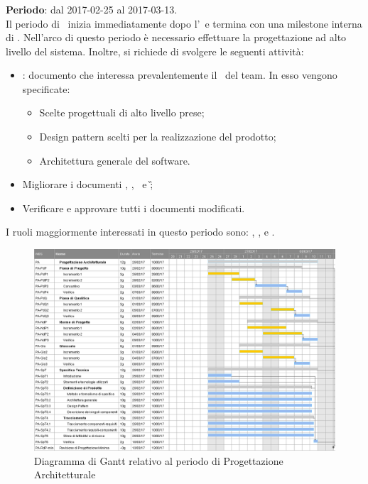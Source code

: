 		
		\subsubsection{\PA}
		\textbf{Periodo}: dal 2017-02-25 al 2017-03-13.\\
		Il periodo di \PA\ inizia immediatamente dopo l'\AR\ e termina con una milestone interna di \RPMin. Nell'arco di questo periodo è necessario effettuare la progettazione ad alto livello del sistema. Inoltre, si richiede di svolgere le seguenti attività:
		\begin{itemize}
			\item \textit{\ST}: documento che interessa prevalentemente il \textit{\Prog}\ del team. In esso vengono specificate:
			\begin{itemize}
				\item Scelte progettuali di alto livello prese;
				\item Design pattern scelti per la realizzazione del prodotto;
				\item Architettura generale del software.
			\end{itemize}
			\item Migliorare i documenti \NdP, \PdP, \PdQ\ e \G;
			\item Verificare e approvare tutti i documenti modificati.
		\end{itemize}
		I ruoli maggiormente interessati in questo periodo sono: \textit{\Amm}, \textit{\Res}, \textit{\Prog} e \textit{\Ver}.
		
		\begin{figure}[ht]
			\centering
			\includegraphics[scale=0.4]{img/ganttnetbreak3.png}
			\caption{Diagramma di Gantt relativo al periodo di Progettazione Architetturale}
		\end{figure}
		\FloatBarrier
	
